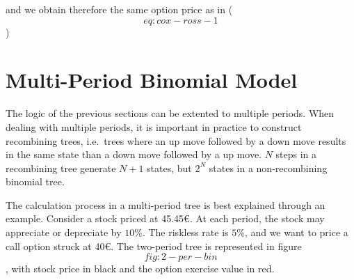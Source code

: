 \documentclass[justified]{tufte-book}
\begin{document}
and we obtain therefore the same option price as in (\[eq:cox-ross-1\])

\hypertarget{multi-period-binomial-model}{%
\section{Multi-Period Binomial Model}\label{multi-period-binomial-model}}

The logic of the previous sections can be extented to multiple periods.
When dealing with multiple periods, it is important in practice to
construct recombining trees, i.e.~trees where an up move followed by a
down move results in the same state than a down move followed by a up
move. \(N\) steps in a recombining tree generate \(N+1\) states, but \(2^N\)
states in a non-recombining binomial tree.

The calculation process in a multi-period tree is best explained through
an example. Consider a stock priced at 45.45€. At each period, the stock
may appreciate or depreciate by \(10\%\). The riskless rate is \(5\%\), and
we want to price a call option struck at 40€. The two-period tree is
represented in figure~\[fig:2-per-bin\], with stock price in black and
the option exercise value in red.

\end{document}

